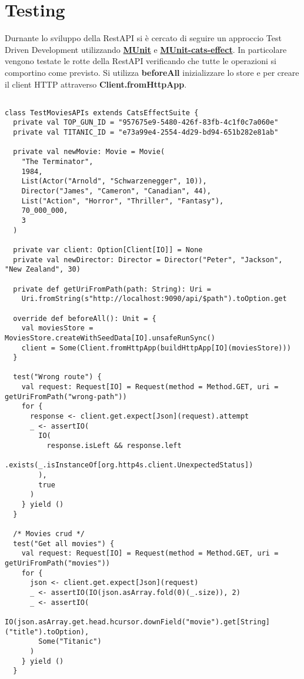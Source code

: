 \chapter{Testing}
Durnante lo sviluppo della RestAPI si è cercato di seguire un approccio Test Driven Development utilizzando \href{https://scalameta.org/munit/}{\textbf{MUnit}} e \href{https://github.com/typelevel/munit-cats-effect}{\textbf{MUnit-cats-effect}}. In particolare vengono testate le rotte della RestAPI verificando che tutte le operazioni si comportino come previsto. Si utilizza  \textbf{beforeAll} inizializzare lo store e per creare il client HTTP attraverso \textbf{Client.fromHttpApp}.

\begin{verbatim}

class TestMoviesAPIs extends CatsEffectSuite {
  private val TOP_GUN_ID = "957675e9-5480-426f-83fb-4c1f0c7a060e"
  private val TITANIC_ID = "e73a99e4-2554-4d29-bd94-651b282e81ab"

  private val newMovie: Movie = Movie(
    "The Terminator",
    1984,
    List(Actor("Arnold", "Schwarzenegger", 10)),
    Director("James", "Cameron", "Canadian", 44),
    List("Action", "Horror", "Thriller", "Fantasy"),
    70_000_000,
    3
  )

  private var client: Option[Client[IO]] = None
  private val newDirector: Director = Director("Peter", "Jackson", "New Zealand", 30)

  private def getUriFromPath(path: String): Uri =
    Uri.fromString(s"http://localhost:9090/api/$path").toOption.get

  override def beforeAll(): Unit = {
    val moviesStore = MoviesStore.createWithSeedData[IO].unsafeRunSync()
    client = Some(Client.fromHttpApp(buildHttpApp[IO](moviesStore)))
  }

  test("Wrong route") {
    val request: Request[IO] = Request(method = Method.GET, uri = getUriFromPath("wrong-path"))
    for {
      response <- client.get.expect[Json](request).attempt
      _ <- assertIO(
        IO(
          response.isLeft && response.left
            .exists(_.isInstanceOf[org.http4s.client.UnexpectedStatus])
        ),
        true
      )
    } yield ()
  }

  /* Movies crud */
  test("Get all movies") {
    val request: Request[IO] = Request(method = Method.GET, uri = getUriFromPath("movies"))
    for {
      json <- client.get.expect[Json](request)
      _ <- assertIO(IO(json.asArray.fold(0)(_.size)), 2)
      _ <- assertIO(
        IO(json.asArray.get.head.hcursor.downField("movie").get[String]("title").toOption),
        Some("Titanic")
      )
    } yield ()
  }


\end{verbatim}
